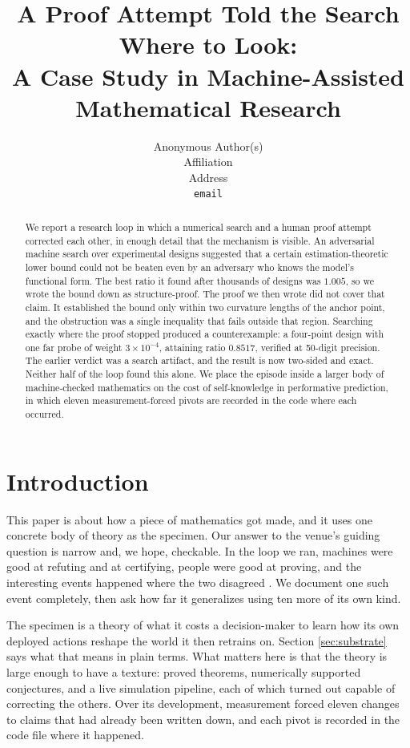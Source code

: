 \documentclass{article}
\title{A Proof Attempt Told the Search Where to Look:\\
A Case Study in Machine-Assisted Mathematical Research}
\author{%
  Anonymous Author(s) \\
  Affiliation \\
  Address \\
  \texttt{email} \\
}
\begin{document}
\maketitle

\begin{abstract}
We report a research loop in which a numerical search and a human proof
attempt corrected each other, in enough detail that the mechanism is
visible. An adversarial machine search over experimental designs suggested
that a certain estimation-theoretic lower bound could not be beaten even by
an adversary who knows the model's functional form. The best ratio it found
after thousands of designs was $1.005$, so we wrote the bound down as
structure-proof. The proof we then wrote did not cover that claim. It
established the bound only within two curvature lengths of the anchor point,
and the obstruction was a single inequality that fails outside that region.
Searching exactly where the proof stopped produced a counterexample: a
four-point design with one far probe of weight $3\times 10^{-4}$, attaining
ratio $0.8517$, verified at 50-digit precision. The earlier verdict was a
search artifact, and the result is now two-sided and exact. Neither half of
the loop found this alone. We place the episode inside a larger body of
machine-checked mathematics on the cost of self-knowledge in performative
prediction, in which eleven measurement-forced pivots are recorded in the
code where each occurred.
\end{abstract}

\section{Introduction}
\label{sec:intro}

This paper is about how a piece of mathematics got made, and it uses one
concrete body of theory as the specimen. Our answer to the venue's guiding
question is narrow and, we hope, checkable. In the loop we ran, machines were
good at refuting and at certifying, people were good at proving, and the
interesting events happened where the two disagreed
\citep{davies2021advancing,wagner2021constructions}. We document one such
event completely, then ask how far it generalizes using ten more of its own
kind.

The specimen is a theory of what it costs a decision-maker to learn how its
own deployed actions reshape the world it then retrains on. Section
\ref{sec:substrate} says what that means in plain terms. What matters here is
that the theory is large enough to have a texture: proved theorems,
numerically supported conjectures, and a live simulation pipeline, each of
which turned out capable of correcting the others. Over its development,
measurement forced eleven changes to claims that had already been written
down, and each pivot is recorded in the code file where it happened.
\end{document}
